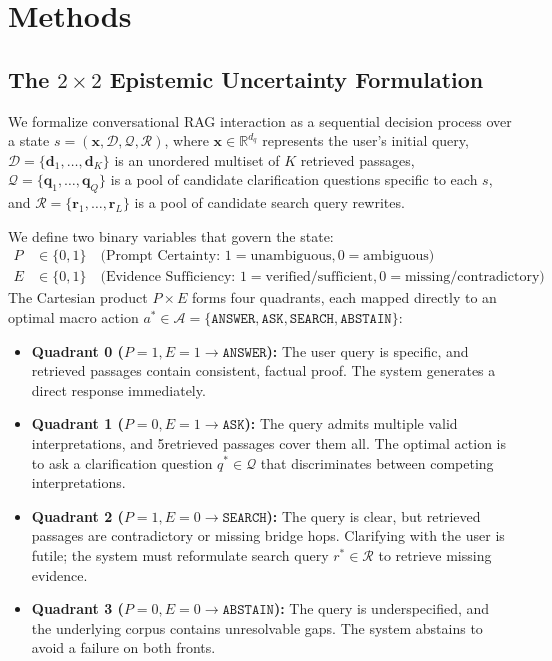 \section{Methods}
\label{sec:methods}

\subsection{The $2 \times 2$ Epistemic Uncertainty Formulation}
We formalize conversational RAG interaction as a sequential decision process over a state $s = (\mathbf{x}, \mathcal{D}, \mathcal{Q}, \mathcal{R})$, where $\mathbf{x} \in \mathbb{R}^{d_q}$ represents the user's initial query, $\mathcal{D} = \{\bm{d}_1, \dots, \bm{d}_K\}$ is an unordered multiset of $K$ retrieved passages, $\mathcal{Q} = \{\bm{q}_1, \dots, \bm{q}_Q\}$ is a pool of candidate clarification questions specific to each $s$, and $\mathcal{R} = \{\bm{r}_1, \dots, \bm{r}_L\}$ is a pool of candidate search query rewrites.

We define two binary variables that govern the state:
\begin{align*}
    P &\in \{0, 1\} \quad \text{(Prompt Certainty: } 1 = \text{unambiguous}, 0 = \text{ambiguous)} \\
    E &\in \{0, 1\} \quad \text{(Evidence Sufficiency: } 1 = \text{verified/sufficient}, 0 = \text{missing/contradictory)}
\end{align*}
The Cartesian product $P \times E$ forms four quadrants, each mapped directly to an optimal macro action $a^* \in \mathcal{A} = \{\texttt{ANSWER}, \texttt{ASK}, \texttt{SEARCH}, \texttt{ABSTAIN}\}$:
\begin{itemize}
    \item \textbf{Quadrant 0 ($P=1, E=1 \to \texttt{ANSWER}$):} The user query is specific, and retrieved passages contain consistent, factual proof. The system generates a direct response immediately.
    \item \textbf{Quadrant 1 ($P=0, E=1 \to \texttt{ASK}$):} The query admits multiple valid interpretations, and 5retrieved passages cover them all. The optimal action is to ask a clarification question $q^* \in \mathcal{Q}$ that discriminates between competing interpretations.
    \item \textbf{Quadrant 2 ($P=1, E=0 \to \texttt{SEARCH}$):} The query is clear, but retrieved passages are contradictory or missing bridge hops. Clarifying with the user is futile; the system must reformulate search query $r^* \in \mathcal{R}$ to retrieve missing evidence.
    \item \textbf{Quadrant 3 ($P=0, E=0 \to \texttt{ABSTAIN}$):} The query is underspecified, and the underlying corpus contains unresolvable gaps. The system abstains to avoid a failure on both fronts.
\end{itemize}

